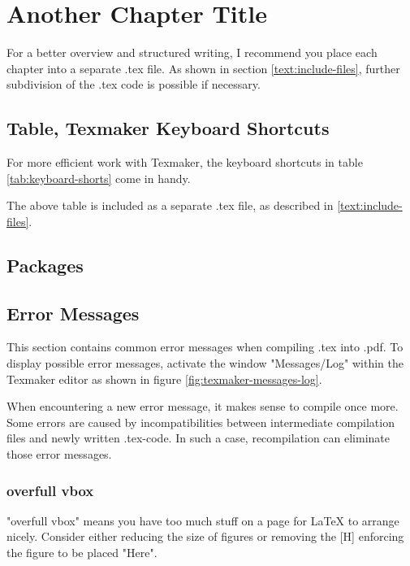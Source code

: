 \chapter{Another Chapter Title}

For a better overview and structured writing, I recommend you place each chapter into a separate .tex file.
As shown in section \ref{text:include-files}, further subdivision of the .tex code is possible if necessary.

\section{Table, Texmaker Keyboard Shortcuts}

For more efficient work with Texmaker, the keyboard shortcuts in table \ref{tab:keyboard-shorts} come in handy.



The above table is included as a separate .tex file, as described in \ref{text:include-files}.


\section{Packages}


\section{Error Messages}

This section contains common error messages when compiling .tex into .pdf.
To display possible error messages, activate the window "Messages/Log" within the Texmaker editor as shown in figure \ref{fig:texmaker-messages-log}.

When encountering a new error message, it makes sense to compile once more.
Some errors are caused by incompatibilities between intermediate compilation files and newly written .tex-code. In such a case, recompilation can eliminate those error messages.

\subsection{overfull vbox}

%

"overfull  vbox" means you have too much stuff on a page for LaTeX to arrange nicely. Consider either reducing the size of figures or removing the [H] enforcing the figure to be placed "Here".

